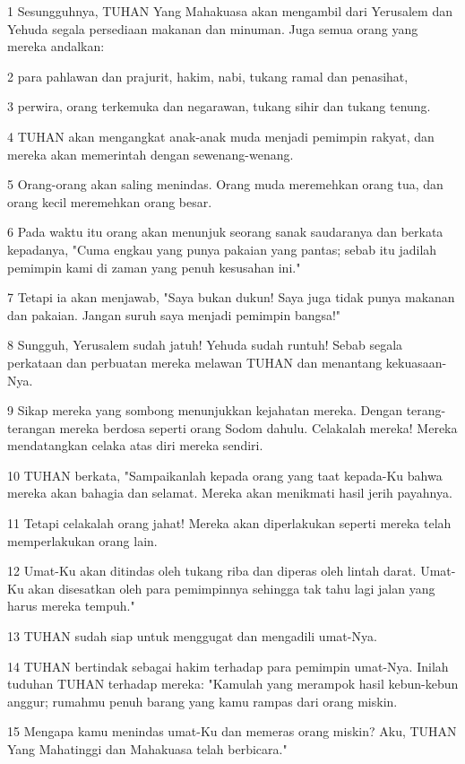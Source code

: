 \par 1 Sesungguhnya, TUHAN Yang Mahakuasa akan mengambil dari Yerusalem dan Yehuda segala persediaan makanan dan minuman. Juga semua orang yang mereka andalkan:
\par 2 para pahlawan dan prajurit, hakim, nabi, tukang ramal dan penasihat,
\par 3 perwira, orang terkemuka dan negarawan, tukang sihir dan tukang tenung.
\par 4 TUHAN akan mengangkat anak-anak muda menjadi pemimpin rakyat, dan mereka akan memerintah dengan sewenang-wenang.
\par 5 Orang-orang akan saling menindas. Orang muda meremehkan orang tua, dan orang kecil meremehkan orang besar.
\par 6 Pada waktu itu orang akan menunjuk seorang sanak saudaranya dan berkata kepadanya, "Cuma engkau yang punya pakaian yang pantas; sebab itu jadilah pemimpin kami di zaman yang penuh kesusahan ini."
\par 7 Tetapi ia akan menjawab, "Saya bukan dukun! Saya juga tidak punya makanan dan pakaian. Jangan suruh saya menjadi pemimpin bangsa!"
\par 8 Sungguh, Yerusalem sudah jatuh! Yehuda sudah runtuh! Sebab segala perkataan dan perbuatan mereka melawan TUHAN dan menantang kekuasaan-Nya.
\par 9 Sikap mereka yang sombong menunjukkan kejahatan mereka. Dengan terang-terangan mereka berdosa seperti orang Sodom dahulu. Celakalah mereka! Mereka mendatangkan celaka atas diri mereka sendiri.
\par 10 TUHAN berkata, "Sampaikanlah kepada orang yang taat kepada-Ku bahwa mereka akan bahagia dan selamat. Mereka akan menikmati hasil jerih payahnya.
\par 11 Tetapi celakalah orang jahat! Mereka akan diperlakukan seperti mereka telah memperlakukan orang lain.
\par 12 Umat-Ku akan ditindas oleh tukang riba dan diperas oleh lintah darat. Umat-Ku akan disesatkan oleh para pemimpinnya sehingga tak tahu lagi jalan yang harus mereka tempuh."
\par 13 TUHAN sudah siap untuk menggugat dan mengadili umat-Nya.
\par 14 TUHAN bertindak sebagai hakim terhadap para pemimpin umat-Nya. Inilah tuduhan TUHAN terhadap mereka: "Kamulah yang merampok hasil kebun-kebun anggur; rumahmu penuh barang yang kamu rampas dari orang miskin.
\par 15 Mengapa kamu menindas umat-Ku dan memeras orang miskin? Aku, TUHAN Yang Mahatinggi dan Mahakuasa telah berbicara."
